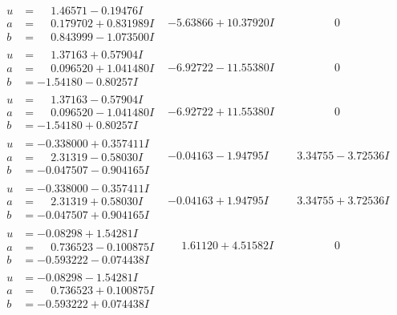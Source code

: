\documentclass[1p]{elsarticle_modified}
\theoremstyle{definition}
\begin{document}
$$\begin{array}{c|c|c}
\begin{aligned}
u &= \phantom{-}1.46571 - 0.19476 I \\
a &= \phantom{-}0.179702 + 0.831989 I \\
b &= \phantom{-}0.843999 - 1.073500 I\end{aligned}
 & -5.63866 + 10.37920 I & \phantom{-0.000000 } 0 \\ \hline\begin{aligned}
u &= \phantom{-}1.37163 + 0.57904 I \\
a &= \phantom{-}0.096520 + 1.041480 I \\
b &= -1.54180 - 0.80257 I\end{aligned}
 & -6.92722 - 11.55380 I & \phantom{-0.000000 } 0 \\ \hline\begin{aligned}
u &= \phantom{-}1.37163 - 0.57904 I \\
a &= \phantom{-}0.096520 - 1.041480 I \\
b &= -1.54180 + 0.80257 I\end{aligned}
 & -6.92722 + 11.55380 I & \phantom{-0.000000 } 0 \\ \hline\begin{aligned}
u &= -0.338000 + 0.357411 I \\
a &= \phantom{-}2.31319 - 0.58030 I \\
b &= -0.047507 - 0.904165 I\end{aligned}
 & -0.04163 - 1.94795 I & \phantom{-}3.34755 - 3.72536 I \\ \hline\begin{aligned}
u &= -0.338000 - 0.357411 I \\
a &= \phantom{-}2.31319 + 0.58030 I \\
b &= -0.047507 + 0.904165 I\end{aligned}
 & -0.04163 + 1.94795 I & \phantom{-}3.34755 + 3.72536 I \\ \hline\begin{aligned}
u &= -0.08298 + 1.54281 I \\
a &= \phantom{-}0.736523 - 0.100875 I \\
b &= -0.593222 - 0.074438 I\end{aligned}
 & \phantom{-}1.61120 + 4.51582 I & \phantom{-0.000000 } 0 \\ \hline\begin{aligned}
u &= -0.08298 - 1.54281 I \\
a &= \phantom{-}0.736523 + 0.100875 I \\
b &= -0.593222 + 0.074438 I\end{aligned}

\end{array}$$
\end{document}
